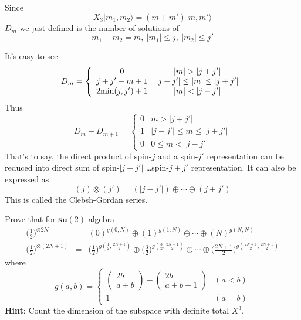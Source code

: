 \documentclass[12pt]{book}
\begin{document}
	Since
	\begin{equation}
		X_3|m_1,m_2\rangle=(m+m')|m,m'\rangle
	\end{equation}
	$D_m$ we just defined is the number of solutions of
	\begin{equation}
		m_1+m_2=m,\ |m_1|\leq j,\ |m_2|\leq j'
	\end{equation}
	
	It's easy to see
	\begin{equation}
		D_m=\left\{\begin{array}{cc}
		0&|m|>|j+j'|\\
		j+j'-m+1&|j-j'|\leq|m|\leq|j+j'|\\
		2{\rm min}(j,j')+1&|m|<|j-j'|
		\end{array}\right.
	\end{equation}
	Thus
	\begin{equation}
		D_m-D_{m+1}=\left\{\begin{array}{cc}
		0&m>|j+j'|\\
		1&|j-j'|\leq m\leq|j+j'|\\
		0&0\leq m<|j-j'|
		\end{array}\right.
	\end{equation}
	That's to say, the direct product of spin-$j$ and a spin-$j'$ representation can be reduced into direct sum of spin-$|j-j'|$ \dots spin-$j+j'$ representation. It can also be expressed as 
	\begin{equation}
		(j)\otimes(j')=(|j-j'|)\oplus\cdots\oplus(j+j')
	\end{equation}
	This is called the Clebsh-Gordan series.
	\begin{myExercise}
		Prove that for $\textbf{su}(2)$ algebra
		\begin{eqnarray}
		\Big(\frac 12\Big)^{\otimes 2N}&=&(0)^{g(0,N)}\oplus(1)^{g(1,N)}\oplus\cdots\oplus(N)^{g(N,N)}\\
		\Big(\frac 12\Big)^{\otimes(2N+1)}&=&\Big(\frac 12\Big)^{g(\frac 12,\frac {2N+1}2)}\oplus\Big(\frac 32\Big)^{g(\frac 32,\frac {2N+1}2)}\oplus\cdots\oplus\Big(\frac {2N+1}2\Big)^{g(\frac {2N+1}2,\frac {2N+1}2)}
		\end{eqnarray}
		where
		\begin{equation}
		g(a,b)=\left\{\begin{array}{ll}
		\left(\begin{array}{c}2b\\a+b\end{array}\right)-\left(\begin{array}{c}2b\\a+b+1\end{array}\right)&(a<b)\\
		1&(a=b)
		\end{array}\right.
		\end{equation}
		\textbf{Hint}: Count the dimension of the subspace with definite total $X^3$.
	\end{myExercise}
	
	
	
	
	
	
	
	
	
	
	
	
	
	
	
	
	\printindex
	
\end{document}
